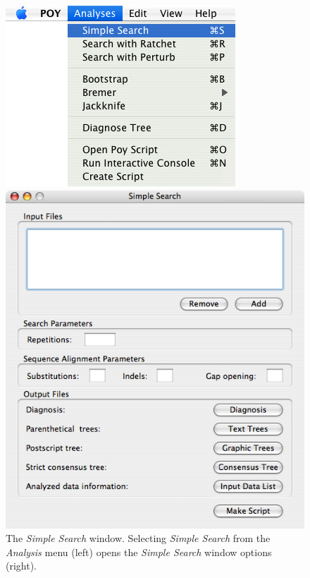 \begin{figure}
\centering
\begin{minipage}[c]{0.48\textwidth}
   		\includegraphics[width=\textwidth]{doc/figures/simplesearch_menu.jpg}
\end{minipage}
\quad
\begin{minipage}[c]{0.48\textwidth}
	   	\includegraphics[width=\textwidth]{doc/figures/simplesearch_window.jpg}
   	\end{minipage}
	
\caption{The \emph{Simple Search} window. Selecting \emph{Simple Search} from the \emph{Analysis} menu (left) opens the \emph{Simple Search} window options (right).}
\label{fig:simple_search_window}
\end{figure}


